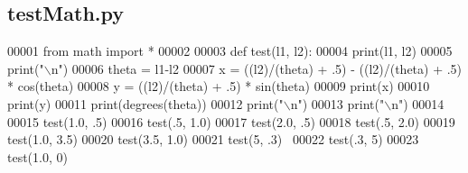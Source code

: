 \subsection{test\+Math.\+py}
\label{test__code_2test_math_8py_source}

\begin{DoxyCode}
00001 \textcolor{keyword}{from} math \textcolor{keyword}{import} *
00002 
00003 \textcolor{keyword}{def }test(l1, l2):
00004     print(l1, l2)
00005     print(\textcolor{stringliteral}{"\(\backslash\)n"})
00006     theta = l1-l2
00007     x = ((l2)/(theta) + .5) - ((l2)/(theta) + .5) * cos(theta)
00008     y = ((l2)/(theta) + .5) * sin(theta)
00009     print(x)
00010     print(y)
00011     print(degrees(theta))
00012     print(\textcolor{stringliteral}{"\(\backslash\)n"})
00013     print(\textcolor{stringliteral}{"\(\backslash\)n"})
00014 
00015 test(1.0, .5)
00016 test(.5, 1.0)
00017 test(2.0, .5)
00018 test(.5, 2.0)
00019 test(1.0, 3.5)
00020 test(3.5, 1.0)
00021 test(5, .3) 
00022 test(.3, 5)
00023 test(1.0, 0)
\end{DoxyCode}

